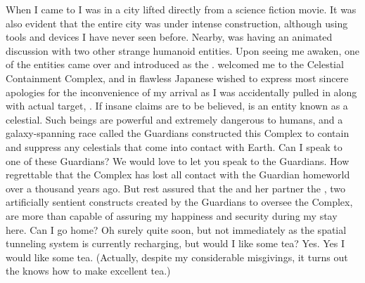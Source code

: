 \documentclass[char]{guardians}
\begin{document}
When I came to I was in a city lifted directly from a science fiction movie. It was also evident that the entire city was under intense construction, although using tools and devices I have never seen before. Nearby, \cUnity{} was having an animated discussion with two other strange humanoid entities. Upon seeing me awaken, one of the entities came over and introduced \cCaretaker{\themself} as the \cCaretaker{}. \cCaretaker{\They} welcomed me to the Celestial Containment Complex, and in flawless Japanese wished to express \cCaretaker{\their} most sincere apologies for the inconvenience of my arrival as I was accidentally pulled in along with \cCaretaker{\their} actual target, \cUnity{}. If \cCaretaker{\their} insane claims are to be believed, \cUnity{} is an entity known as a celestial. Such beings are powerful and extremely dangerous to humans, and a galaxy-spanning race called the Guardians constructed this Complex to contain and suppress any celestials that come into contact with Earth. Can I speak to one of these Guardians? We would love to let you speak to the Guardians. How regrettable that the Complex has lost all contact with the Guardian homeworld over a thousand years ago. But rest assured that the \cCaretaker{} and her partner the \cWarden{}, two artificially sentient constructs created by the Guardians to oversee the Complex, are more than capable of assuring my happiness and security during my stay here. Can I go home? Oh surely quite soon, but not immediately as the spatial tunneling system is currently recharging, but would I like some tea? Yes. Yes I would like some tea. (Actually, despite my considerable misgivings, it turns out the \cCaretaker{} knows how to make excellent tea.)
\end{document}
